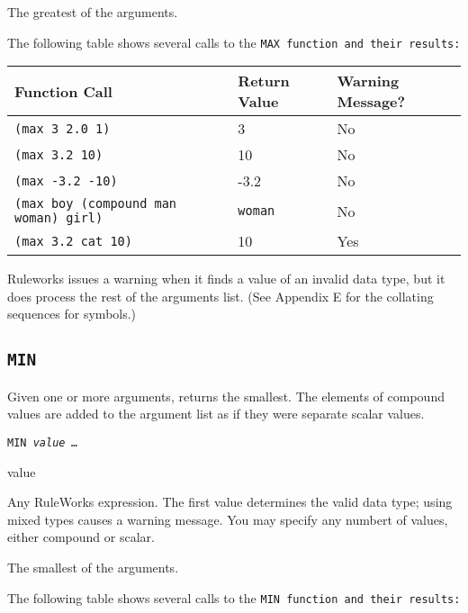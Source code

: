 \ReturnValue

The greatest of the arguments.

\Example

The following table shows several calls to the \tt{MAX} function and
their results:

\begin{center}
\begin{tabular}{lll}
  \toprule
  Function Call & Return Value & Warning Message? \\
  \midrule
  \tt{(max 3 2.0 1)} & 3 & No \\
  \tt{(max 3.2 10)} &   10 & No  \\
  \tt{(max -3.2 -10)} &   -3.2 &   No \\
  \tt{(max boy (compound man woman) girl)} & \tt{woman} & No \\
  \tt{(max 3.2 cat 10)} & 10 & Yes \\
  \bottomrule
\end{tabular}
\end{center}

\begin{note}
  Ruleworks issues a warning when it finds a value of an invalid data
  type, but it does process the rest of the arguments list. (See
  Appendix E for the collating sequences for symbols.)
\end{note}

\subsection{\tt{MIN}}

Given one or more arguments, returns the smallest. The elements of
compound values are added to the argument list as if they were
separate scalar values.

\Format

\tt{MIN} \it{value} \ldots

\begin{arguments}
\item[value]

  Any RuleWorks expression. The first value determines the valid data
  type; using mixed types causes a warning message.  You may specify
  any numbert of values, either compound or scalar.
\end{arguments}

\ReturnValue

The smallest of the arguments.

\Example

The following table shows several calls to the \tt{MIN} function and their
results:

